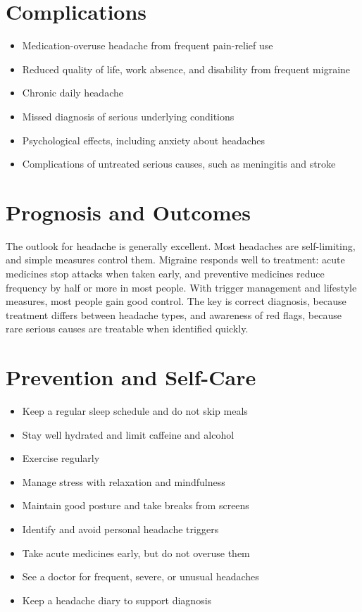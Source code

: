 \section*{Complications}
\begin{itemize}
    \item Medication-overuse headache from frequent pain-relief use
    \item Reduced quality of life, work absence, and disability from frequent migraine
    \item Chronic daily headache
    \item Missed diagnosis of serious underlying conditions
    \item Psychological effects, including anxiety about headaches
    \item Complications of untreated serious causes, such as meningitis and stroke
\end{itemize}

\section*{Prognosis and Outcomes}
The outlook for headache is generally excellent. Most headaches are self-limiting, and simple measures control them. Migraine responds well to treatment: acute medicines stop attacks when taken early, and preventive medicines reduce frequency by half or more in most people. With trigger management and lifestyle measures, most people gain good control. The key is correct diagnosis, because treatment differs between headache types, and awareness of red flags, because rare serious causes are treatable when identified quickly.

\section*{Prevention and Self-Care}
\begin{itemize}
    \item Keep a regular sleep schedule and do not skip meals
    \item Stay well hydrated and limit caffeine and alcohol
    \item Exercise regularly
    \item Manage stress with relaxation and mindfulness
    \item Maintain good posture and take breaks from screens
    \item Identify and avoid personal headache triggers
    \item Take acute medicines early, but do not overuse them
    \item See a doctor for frequent, severe, or unusual headaches
    \item Keep a headache diary to support diagnosis
\end{itemize}

